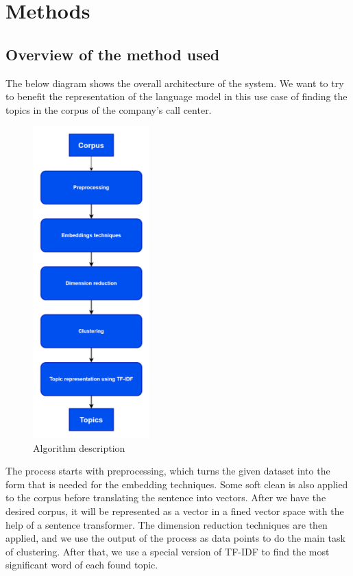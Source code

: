 \chapter{Methods}

\startcontents[chapters]
\printmyminitoc{
}


\section{Overview of the method used}



The below diagram shows the overall architecture of the system. We want to try to benefit the representation of the language model in this use case of finding the topics in the corpus of the company's call center.

\begin{figure}[H]
    \centering
    \includegraphics[width=0.4\textwidth]{images/describe_nlp.drawio.png}
    \caption{Algorithm description}
    \label{fig:nlp_describe}
\end{figure}

The process starts with preprocessing, which turns the given dataset into the form that is needed for the embedding techniques. Some soft clean is also applied to the corpus before translating the sentence into vectors. After we have the desired corpus, it will be represented as a vector in a fined vector space with the help of a sentence transformer. The dimension reduction techniques are then applied, and we use the output of the process as data points to do the main task of clustering. After that, we use a special version of TF-IDF to find the most significant word of each found topic.

